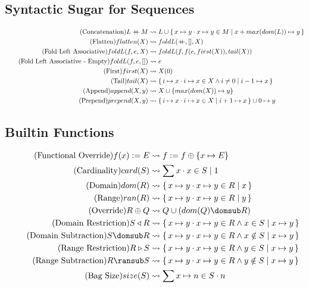 \documentclass{article}
\newcommand{\bSet}[3]{%
  \{\, #1 \cdot #2 \mid #3 \, \}%
}
\newcommand{\concat}{%
  \mathbin{{+}\mspace{-8mu}{+}}%
}
\begin{document}
\subsection{Syntactic Sugar for Sequences}
\begin{align}
    \tag{Concatenation}
    L \concat M
    &\leadsto
    L \cup \bSet{x \mapsto y}{x \mapsto y \in M }{x + max(dom(L)) \mapsto y}
    \\
    \tag{Flatten}
    flatten(X)
    &\leadsto
    foldL(\concat, [], X)
    \\
    \tag{Fold Left Associative}
    foldL(f, e, X)
    &\leadsto
    foldL(f, f(e, first(X)), tail(X))
    \\
    \tag{Fold Left Associative - Empty}
    foldL(f, e, [])
    &\leadsto
    e
    \\
    \tag{First}
    first(X)
    &\leadsto
    X(0)
    \\
    \tag{Tail}
    tail(X)
    &\leadsto
    \bSet{i \mapsto x}{i \mapsto x \in X \land i \neq 0}{i-1 \mapsto x}
    \\
    \tag{Append}
    append(X, y)
    &\leadsto
    X \cup \{max(dom(X)) \mapsto y\}
    \\
    \tag{Prepend}
    prepend(X, y)
    &\leadsto
    \bSet{i \mapsto x}{i \mapsto x \in X}{i+1 \mapsto x} \cup {0 \mapsto y}
\end{align}
\subsection{Builtin Functions}

\noindent\begin{minipage}{\linewidth}
\begin{align}
  \tag{Functional Override}
  f(x) := E
  &\leadsto
  f := f \oplus \{x \mapsto E\}
  \\
  \tag{Cardinality}
  card(S)
  &\leadsto
  \sum x \cdot x \in S \mid 1
  \\
  \tag{Domain}
  dom(R)
  &\leadsto
  \bSet{x \mapsto y}{x \mapsto y \in R}{x}
  \\
  \tag{Range}
  ran(R)
  &\leadsto
  \bSet{x \mapsto y}{x \mapsto y \in R}{y}
  \\
  \tag{Override}
  R \oplus Q &\leadsto Q \cup (dom(Q) \domsub R)
  \\
  \tag{Domain Restriction}
  S \triangleleft R &\leadsto \bSet{x\mapsto y}{x \mapsto y \in R \land x \in S}{x \mapsto y}
  \\
  \tag{Domain Subtraction}
  S \domsub R &\leadsto \bSet{x\mapsto y}{x \mapsto y \in R \land x \notin S}{x \mapsto y}
  \\
  \tag{Range Restriction}
  R \triangleright S &\leadsto \bSet{x\mapsto y}{x \mapsto y \in R \land y \in S}{x \mapsto y}
  \\
  \tag{Range Subtraction}
  R \ransub S &\leadsto \bSet{x\mapsto y}{x \mapsto y \in R \land y \notin S}{x \mapsto y}
   \\
  \tag{Bag Size}
  size(S) &\leadsto \sum x \mapsto n \in S \cdot n
\end{align}
\end{minipage}
\end{document}
